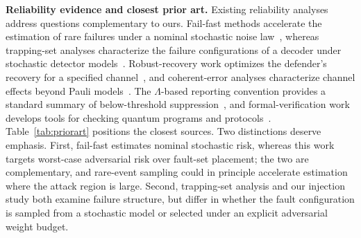 \documentclass[pdflatex,sn-mathphys-num]{sn-jnl}
\theoremstyle{thmstyleone}
\theoremstyle{thmstyletwo}
\theoremstyle{thmstylethree}
\begin{document}
\noindent\textbf{Reliability evidence and closest prior art.} Existing reliability analyses address questions complementary to ours. Fail-fast methods accelerate the estimation of rare failures under a nominal stochastic noise law~\cite{beverland2025failfast}, whereas trapping-set analyses characterize the failure configurations of a decoder under stochastic detector models~\cite{Pacenti2026trapping}. Robust-recovery work optimizes the defender's recovery for a specified channel~\cite{kosut2008robust}, and coherent-error analyses characterize channel effects beyond Pauli models~\cite{huang2019coherent}. The $\Lambda$-based reporting convention provides a standard summary of below-threshold suppression~\cite{Acharya2024lambda}, and formal-verification work develops tools for checking quantum programs and protocols~\cite{RandPaykinZdancewic2018,Hietala2021,Bordg2021,Lewis2023}. Table~\ref{tab:priorart} positions the closest sources. Two distinctions deserve emphasis. First, fail-fast estimates nominal stochastic risk, whereas this work targets worst-case adversarial risk over fault-set placement; the two are complementary, and rare-event sampling could in principle accelerate estimation where the attack region is large. Second, trapping-set analysis and our injection study both examine failure structure, but differ in whether the fault configuration is sampled from a stochastic model or selected under an explicit adversarial weight budget.
\end{document}
